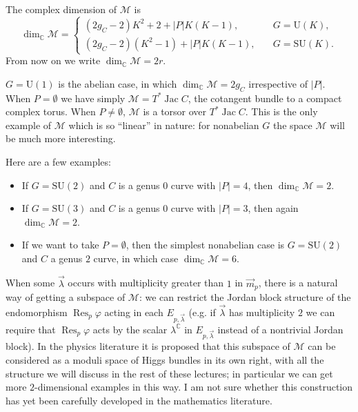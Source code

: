 \documentclass[12pt,letterpaper,reqno]{article}
\numberwithin{equation}{section}
\newcommand{\cM}{\ensuremath{\mathcal M}}
\newcommand{\C}{\ensuremath{\mathbb C}}
\newcommand{\abs}[1]{\lvert#1\rvert}
\DeclareMathOperator{\Jac}{Jac}
\DeclareMathOperator{\Res}{Res}
\newcommand{\SU}{\mathrm{SU}}
\newcommand{\U}{\mathrm{U}}
\begin{document}
\begin{remark}[Dimension of $\cM$]
The complex dimension of $\cM$ is
\begin{equation} \label{eq:dim-M}
  \dim_\C \cM = \begin{cases} (2g_C-2) K^2 + 2 + \abs{P} K(K-1), & \quad G = \U(K), \\ (2g_C-2) (K^2-1) + \abs{P} K(K-1), & \quad G = \SU(K). \end{cases}
\end{equation}
From now on we write $\dim_\C \cM = 2r$.
\end{remark}

\begin{example}
$G = \U(1)$ is the abelian case, in which $\dim_\C \cM = 2g_C$ irrespective
of $\abs{P}$. When $P = \emptyset$ we have simply $\cM = T^* \Jac C$, the cotangent
bundle to a compact complex torus. When $P \neq \emptyset$, $\cM$ is a torsor
over $T^* \Jac C$.
This is the only example of $\cM$ which is so ``linear'' in nature:
for nonabelian $G$ the space $\cM$ will be much more interesting.
\end{example}

\begin{example} Here are a few examples:
\begin{itemize}
\item If $G = \SU(2)$ and $C$ is a genus $0$ curve with $\abs{P} = 4$,
then $\dim_\C \cM = 2$.
\item If $G = \SU(3)$
and $C$ is a genus $0$ curve with $\abs{P}=3$,
then again $\dim_\C \cM = 2$.
\item If we want to take $P = \emptyset$,
then the simplest nonabelian case is
$G = \SU(2)$ and $C$ a genus $2$ curve, in which case
$\dim_\C \cM = 6$. 
\end{itemize}
\end{example}

\begin{remark}
When some $\vec\lambda$ occurs with multiplicity
greater than $1$ in $\vec{m}_p$, there 
is a natural way of getting a subspace of $\cM$:
we can restrict the Jordan block structure of
the endomorphism $\Res_p \varphi$
acting in each $E_{p,\vec\lambda}$ (e.g. if $\vec\lambda$ has
multiplicity $2$ we can require that $\Res_p \varphi$ acts
by the scalar $\lambda^\C$ in $E_{p,\vec\lambda}$ instead of
a nontrivial Jordan block).
In the physics literature
it is proposed that this subspace of $\cM$ can be considered
as a moduli space of Higgs bundles in its own right, with
all the structure we will discuss
in the rest of these lectures; 
in particular we can get more $2$-dimensional examples in this way.
I am not sure whether this construction has yet been carefully
developed in the mathematics literature.
\end{remark}
\end{document}
